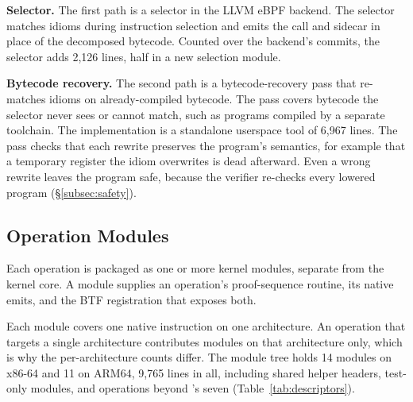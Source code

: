 \noindent\textbf{Selector.}
The first path is a selector in the LLVM eBPF backend.
The selector matches idioms during instruction selection and emits the call and sidecar in place of the decomposed bytecode.
Counted over the backend's \tool commits, the selector adds 2{,}126 lines, half in a new selection module.

\noindent\textbf{Bytecode recovery.}
The second path is a bytecode-recovery pass that re-matches idioms on already-compiled bytecode.
The pass covers bytecode the selector never sees or cannot match, such as programs compiled by a separate toolchain.
The implementation is a standalone userspace tool of 6{,}967 lines.
The pass checks that each rewrite preserves the program's semantics, for example that a temporary register the idiom overwrites is dead afterward.
Even a wrong rewrite leaves the program safe, because the verifier re-checks every lowered program (\S\ref{subsec:safety}).%

\subsection{Operation Modules}
\label{subsec:descriptors}

Each operation is packaged as one or more kernel modules, separate from the kernel core.
A module supplies an operation's proof-sequence routine, its native emits, and the BTF registration that exposes both.

Each module covers one native instruction on one architecture.
An operation that targets a single architecture contributes modules on that architecture only, which is why the per-architecture counts differ.
The module tree holds 14 modules on x86-64 and 11 on ARM64, 9{,}765 lines in all, including shared helper headers, test-only modules, and operations beyond \lang's seven (Table~\ref{tab:descriptors}).
